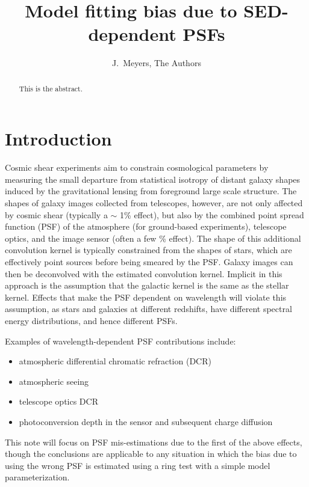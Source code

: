 \documentclass[apj]{emulateapj}
\begin{document}
\title{Model fitting bias due to SED-dependent PSFs}

\author{
J.~Meyers,
The Authors}


\begin{abstract}
This is the abstract.
\end{abstract}

\section{Introduction}\label{sec:intro}
Cosmic shear experiments aim to constrain cosmological parameters by
measuring the small departure from statistical isotropy of distant
galaxy shapes induced by the gravitational lensing from foreground
large scale structure.  The shapes of galaxy images collected from
telescopes, however, are not only affected by cosmic shear (typically
a $\sim$ 1\% effect), but also by the combined point spread function
(PSF) of the atmosphere (for ground-based experiments), telescope
optics, and the image sensor (often a few \% effect).  The shape of
this additional convolution kernel is typically constrained from the
shapes of stars, which are effectively point sources before being
smeared by the PSF.  Galaxy images can then be deconvolved with the
estimated convolution kernel.  Implicit in this approach is the
assumption that the galactic kernel is the same as the stellar kernel.
Effects that make the PSF dependent on wavelength will violate this
assumption, as stars and galaxies at different redshifts, have
different spectral energy distributions, and hence different PSFs.

Examples of wavelength-dependent PSF contributions include:

\begin{itemize}
  \item atmospheric differential chromatic refraction (DCR)
  \item atmospheric seeing
  \item telescope optics DCR
  \item photoconversion depth in the sensor and subsequent charge diffusion
\end{itemize}

This note will focus on PSF mis-estimations due to the first of the
above effects, though the conclusions are applicable to any situation
in which the bias due to using the wrong PSF is estimated using a ring
test with a simple model parameterization.
\end{document}
